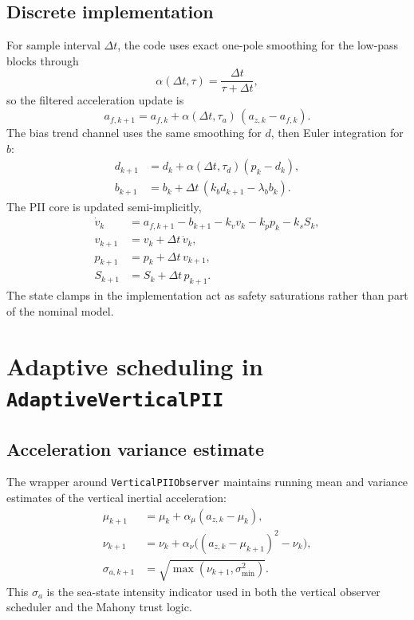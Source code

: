 \documentclass[conference]{IEEEtran}
\begin{document}
\subsection{Discrete implementation}
For sample interval $\Delta t$, the code uses exact one-pole smoothing for the low-pass blocks through
\begin{equation}
\alpha(\Delta t,\tau)=\frac{\Delta t}{\tau+\Delta t},
\end{equation}
so the filtered acceleration update is
\begin{equation}
 a_{f,k+1} = a_{f,k} + \alpha(\Delta t,\tau_a)\,(a_{z,k}-a_{f,k}).
\end{equation}
The bias trend channel uses the same smoothing for $d$, then Euler integration for $b$:
\begin{align}
 d_{k+1} &= d_k + \alpha(\Delta t,\tau_d)(p_k-d_k),\\
 b_{k+1} &= b_k + \Delta t\,(k_b d_{k+1}-\lambda_b b_k).
\end{align}
The PII core is updated semi-implicitly,
\begin{align}
\dot{v}_k &= a_{f,k+1} - b_{k+1} - k_v v_k - k_p p_k - k_s S_k,\\
 v_{k+1} &= v_k + \Delta t\,\dot{v}_k,\\
 p_{k+1} &= p_k + \Delta t\,v_{k+1},\\
 S_{k+1} &= S_k + \Delta t\,p_{k+1}.
\end{align}
The state clamps in the implementation act as safety saturations rather than part of the nominal model.

\section{Adaptive scheduling in \texttt{AdaptiveVerticalPII}}
\subsection{Acceleration variance estimate}
The wrapper around \texttt{VerticalPIIObserver} maintains running mean and variance estimates of the vertical inertial acceleration:
\begin{align}
\mu_{k+1} &= \mu_k + \alpha_\mu(a_{z,k}-\mu_k),\\
\nu_{k+1} &= \nu_k + \alpha_\nu\bigl((a_{z,k}-\mu_{k+1})^2-\nu_k\bigr),\\
\sigma_{a,k+1} &= \sqrt{\max(\nu_{k+1},\sigma_{\min}^2)}.
\end{align}
This $\sigma_a$ is the sea-state intensity indicator used in both the vertical observer scheduler and the Mahony trust logic.
\end{document}
